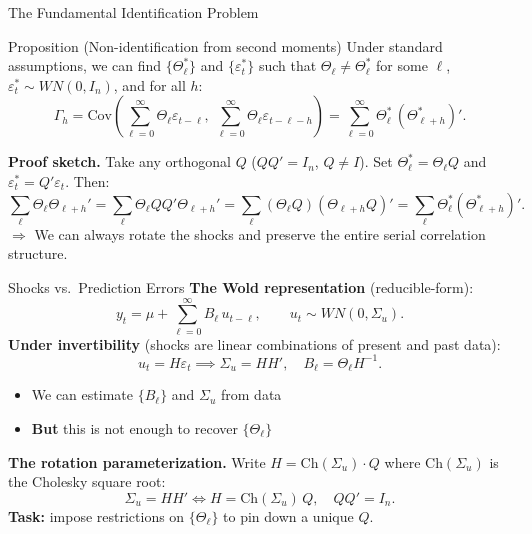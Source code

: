 \documentclass[aspectratio=169,11pt]{beamer}
\newcommand{\Cov}{\text{Cov}}
\begin{document}
\begin{frame}{The Fundamental Identification Problem}
    \begin{block}{Proposition (Non-identification from second moments)}
        Under standard assumptions, we can find $\{\Theta_\ell^*\}$ and $\{\varepsilon_t^*\}$ such that $\Theta_\ell \neq \Theta_\ell^*$ for some $\ell$, $\varepsilon_t^* \sim WN(0, I_n)$, and for all $h$:
        \[
        \Gamma_h = \Cov\!\left(\sum_{\ell=0}^\infty \Theta_\ell \varepsilon_{t-\ell},\; \sum_{\ell=0}^\infty \Theta_\ell \varepsilon_{t-\ell-h}\right) = \sum_{\ell=0}^\infty \Theta_\ell^*\,(\Theta_{\ell+h}^*)'.
        \]
    \end{block}

    \vspace{0.3em}
    \textbf{Proof sketch.} Take any orthogonal $Q$ ($QQ'=I_n$, $Q\neq I$). Set $\Theta_\ell^* = \Theta_\ell Q$ and $\varepsilon_t^* = Q'\varepsilon_t$. Then:
    \[
    \sum_\ell \Theta_\ell \Theta_{\ell+h}' = \sum_\ell \Theta_\ell QQ' \Theta_{\ell+h}' = \sum_\ell (\Theta_\ell Q)(\Theta_{\ell+h} Q)' = \sum_\ell \Theta_\ell^* (\Theta_{\ell+h}^*)'.
    \]
    \textcolor{mitred}{$\Rightarrow$ We can always rotate the shocks and preserve the entire serial correlation structure.} 
\end{frame}

\begin{frame}{Shocks vs.\ Prediction Errors}
    \textbf{The Wold representation} (reducible-form):
    \[
    y_t = \mu + \sum_{\ell=0}^\infty B_\ell\, u_{t-\ell}, \qquad u_t \sim WN(0, \Sigma_u).
    \]
    \textbf{Under invertibility} (shocks are linear combinations of present and past data):
    \[
    u_t = H\varepsilon_t \implies \Sigma_u = HH', \quad B_\ell = \Theta_\ell H^{-1}.
    \]
    \begin{itemize}
        \item We can estimate $\{B_\ell\}$ and $\Sigma_u$ from data
        \item \textbf{But} this is not enough to recover $\{\Theta_\ell\}$
    \end{itemize}

    \vspace{0.4em}
    \textbf{The rotation parameterization.} Write $H = \text{Ch}(\Sigma_u)\cdot Q$ where $\text{Ch}(\Sigma_u)$ is the Cholesky square root:
    \[
    \Sigma_u = HH' \iff H = \text{Ch}(\Sigma_u)\,Q, \quad QQ' = I_n.
    \]
    \textcolor{mitred}{\textbf{Task:} impose restrictions on $\{\Theta_\ell\}$ to pin down a unique $Q$.}
\end{frame}
\end{document}

